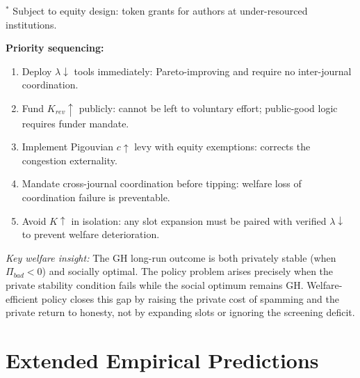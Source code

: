 \documentclass{article}
\begin{document}
\begin{tcolorbox}[boxstyle, title={Box S1\quad Normative Policy Agenda: Welfare Priorities and Justifications}]
\smallskip
\noindent\footnotesize{$^*$ Subject to equity design: token grants for authors at under-resourced institutions.}

\medskip
\noindent\textbf{Priority sequencing:}
\begin{enumerate}[noitemsep, topsep=2pt, leftmargin=*]
  \item Deploy $\lambda\downarrow$ tools immediately: Pareto-improving and require no inter-journal coordination.
  \item Fund $K_{rev}\uparrow$ publicly: cannot be left to voluntary effort; public-good logic requires funder mandate.
  \item Implement Pigouvian $c\uparrow$ levy with equity exemptions: corrects the congestion externality.
  \item Mandate cross-journal coordination before tipping: welfare loss of coordination failure is preventable.
  \item Avoid $K\uparrow$ in isolation: any slot expansion must be paired with verified $\lambda\downarrow$ to prevent welfare deterioration.
\end{enumerate}

\medskip
\noindent\textit{Key welfare insight:}\;
The GH long-run outcome is both privately stable (when $\Pi_{bad} < 0$) and socially optimal.
The policy problem arises precisely when the private stability condition fails while the social optimum remains GH\@.
Welfare-efficient policy closes this gap by raising the private cost of spamming and the private return to honesty, not by expanding slots or ignoring the screening deficit.
\end{tcolorbox}


\section{Extended Empirical Predictions}
\label{app:predictions}
\end{document}
